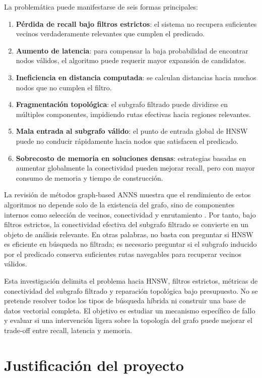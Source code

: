 La problemática puede manifestarse de seis formas principales:
\begin{enumerate}
    \item \textbf{Pérdida de recall bajo filtros estrictos}: el sistema no recupera suficientes vecinos verdaderamente relevantes que cumplen el predicado.
    \item \textbf{Aumento de latencia}: para compensar la baja probabilidad de encontrar nodos válidos, el algoritmo puede requerir mayor expansión de candidatos.
    \item \textbf{Ineficiencia en distancia computada}: se calculan distancias hacia muchos nodos que no cumplen el filtro.
    \item \textbf{Fragmentación topológica}: el subgrafo filtrado puede dividirse en múltiples componentes, impidiendo rutas efectivas hacia regiones relevantes.
    \item \textbf{Mala entrada al subgrafo válido}: el punto de entrada global de HNSW puede no conducir rápidamente hacia nodos que satisfacen el predicado.
    \item \textbf{Sobrecosto de memoria en soluciones densas}: estrategias basadas en aumentar globalmente la conectividad pueden mejorar recall, pero con mayor consumo de memoria y tiempo de construcción.
\end{enumerate}

La revisión de métodos graph-based ANNS muestra que el rendimiento de estos algoritmos no depende solo de la existencia del grafo, sino de componentes internos como selección de vecinos, conectividad y enrutamiento \parencite{wang2021comprehensive}. Por tanto, bajo filtros estrictos, la conectividad efectiva del subgrafo filtrado se convierte en un objeto de análisis relevante. En otras palabras, no basta con preguntar si HNSW es eficiente en búsqueda no filtrada; es necesario preguntar si el subgrafo inducido por el predicado conserva suficientes rutas navegables para recuperar vecinos válidos.

Esta investigación delimita el problema hacia HNSW, filtros estrictos, métricas de conectividad del subgrafo filtrado y reparación topológica bajo presupuesto. No se pretende resolver todos los tipos de búsqueda híbrida ni construir una base de datos vectorial completa. El objetivo es estudiar un mecanismo específico de fallo y evaluar si una intervención ligera sobre la topología del grafo puede mejorar el trade-off entre recall, latencia y memoria.

\section{Justificación del proyecto}

